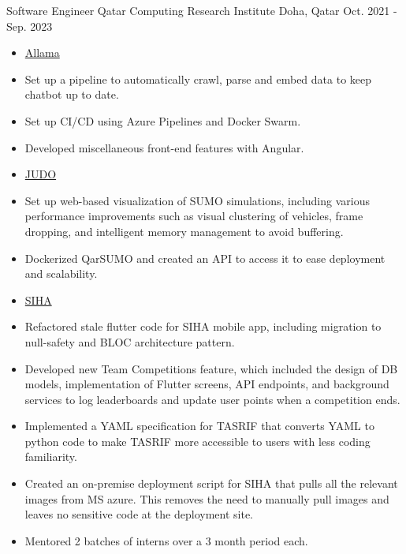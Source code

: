 \begin{cventries}
  \cventry
    {Software Engineer} %
    {Qatar Computing Research Institute} %
    {Doha, Qatar} %
    {Oct. 2021 - Sep. 2023} %
    {
      \vspace{-4.0mm}
      \begin{justify}
      \begin{itemize}[leftmargin=2ex, nosep, noitemsep]
        \setlength{\parskip}{0pt}
        \renewcommand{\labelitemi}{}
        \item {\hspace{-3.0mm}\underline{{Allama}}}
        \renewcommand{\labelitemi}{\bullet}
        \item {Set up a pipeline to automatically crawl, parse and embed data to keep chatbot up to date.}
        \item {Set up CI/CD using Azure Pipelines and Docker Swarm.}
        \item {Developed miscellaneous front-end features with Angular.}
        \renewcommand{\labelitemi}{}
        \item {\hspace{-3.0mm}\underline{{JUDO}}}
        \renewcommand{\labelitemi}{\bullet}
        \item {Set up web-based visualization of SUMO simulations, including various performance improvements such as visual clustering
        of vehicles, frame dropping, and intelligent memory management to avoid buffering.}
        \item {Dockerized QarSUMO and created an API to access it to ease deployment and scalability.}
        \renewcommand{\labelitemi}{}
        \item {\hspace{-3.0mm}\underline{{SIHA}}}
        \renewcommand{\labelitemi}{\bullet}
        \item {Refactored stale flutter code for SIHA mobile app, including migration to null-safety and BLOC architecture pattern.}
        \item {Developed new Team Competitions feature, which included the design of DB models, implementation of Flutter screens,
        API endpoints, and background services to log leaderboards and update user points when a competition ends.}
        \item {Implemented a YAML specification for TASRIF that converts YAML to python code to make TASRIF more accessible to users
        with less coding familiarity.}
        \item {Created an on-premise deployment script for SIHA that pulls all the relevant images from MS azure. This removes the need
        to manually pull images and leaves no sensitive code at the deployment site.}
        \item {Mentored 2 batches of interns over a 3 month period each.}
      \end{itemize}
      \end{justify}
      \vspace{1.0mm}
    }


\end{cventries}
